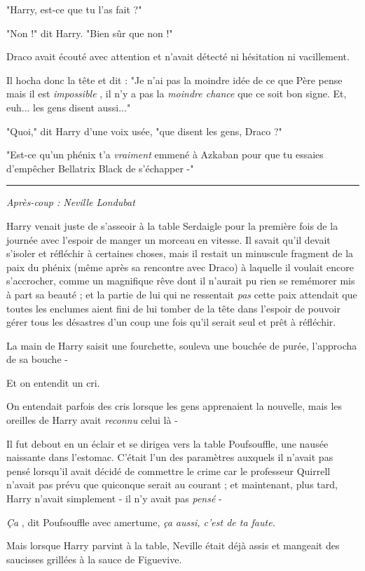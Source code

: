 "Harry, est-ce que tu l'as fait ?"

"Non !" dit Harry. "Bien sûr que non !"

Draco avait écouté avec attention et n'avait détecté ni hésitation ni vacillement.

Il hocha donc la tête et dit : "Je n'ai pas la moindre idée de ce que Père pense mais il est \emph{impossible} , il n'y a pas la \emph{moindre chance}  que ce soit bon signe. Et, euh... les gens disent aussi..."

"Quoi," dit Harry d'une voix usée, "que disent les gens, Draco ?"

"Est-ce qu'un phénix t'a \emph{vraiment}  emmené à Azkaban pour que tu essaies d'empêcher Bellatrix Black de s'échapper -"
\par\noindent\rule{\textwidth}{0.4pt}
\emph{Après-coup : Neville Londubat} 

Harry venait juste de s'asseoir à la table Serdaigle pour la première fois de la journée avec l'espoir de manger un morceau en vitesse. Il savait qu'il devait s'isoler et réfléchir à certaines choses, mais il restait un minuscule fragment de la paix du phénix (même après sa rencontre avec Draco) à laquelle il voulait encore s'accrocher, comme un magnifique rêve dont il n'aurait pu rien se remémorer mis à part sa beauté ; et la partie de lui qui ne ressentait \emph{pas}  cette paix attendait que toutes les enclumes aient fini de lui tomber de la tête dans l'espoir de pouvoir gérer tous les désastres d'un coup une fois qu'il serait seul et prêt à réfléchir.

La main de Harry saisit une fourchette, souleva une bouchée de purée, l'approcha de sa bouche -

Et on entendit un cri.

On entendait parfois des cris lorsque les gens apprenaient la nouvelle, mais les oreilles de Harry avait \emph{reconnu}  celui là -

Il fut debout en un éclair et se dirigea vers la table Poufsouffle, une nausée naissante dans l'estomac. C'était l'un des paramètres auxquels il n'avait pas pensé lorsqu'il avait décidé de commettre le crime car le professeur Quirrell n'avait pas prévu que quiconque serait au courant ; et maintenant, plus tard, Harry n'avait simplement - il n'y avait pas \emph{pensé}  -

\emph{Ça} , dit Poufsouffle avec amertume, \emph{ça aussi, c'est de ta faute.} 

Mais lorsque Harry parvint à la table, Neville était déjà assis et mangeait des saucisses grillées à la sauce de Figuevive.

